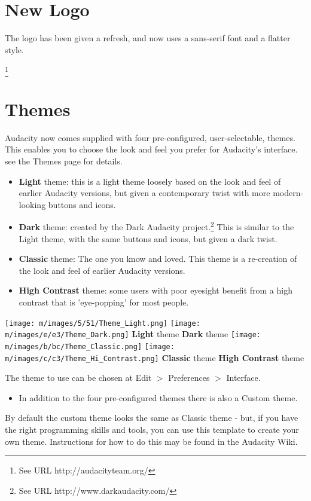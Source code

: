\section{New Logo}


The logo has been given a refresh, and now uses a sans-serif font and a flatter style.

\footnote{See URL http://audacityteam.org/}
\section{Themes}


Audacity now comes supplied with four pre-configured, user-selectable, themes.  This enables you to choose the look and feel you prefer for Audacity's interface. see the Themes page for details.
\begin{itemize}
\item \textbf{Light} theme: this is a light theme loosely based on the look and feel of earlier Audacity versions, but given a contemporary twist with more modern-looking buttons and icons. 
\item \textbf{Dark} theme: created by the Dark Audacity project.\footnote{See URL http://www.darkaudacity.com/} This is similar to the Light theme, with the same buttons and icons, but given a dark twist.
\item \textbf{Classic} theme: The one you know and loved. This theme is a re-creation of the look and feel of earlier Audacity versions. 
\item \textbf{High Contrast} theme: some users with poor eyesight benefit from a high contrast that is 'eye-popping' for most people.
\end{itemize}

\* \* \* \* \texttt{[image: m/images/5/51/Theme\_Light.png]}
\* \* \* \* \texttt{[image: m/images/e/e3/Theme\_Dark.png]}
\* \* \* \* 
\textbf{Light} theme
\* \* \* \* 
\textbf{Dark} theme
\* \* \* \* \texttt{[image: m/images/b/bc/Theme\_Classic.png]}
\* \* \* \* \texttt{[image: m/images/c/c3/Theme\_Hi\_Contrast.png]}
\* \* \* \* 
\textbf{Classic} theme
\* \* \* \* 
\textbf{High Contrast} theme

The theme to use can be chosen at Edit \mbox{$>$} Preferences \mbox{$>$} Interface.  
\begin{itemize}
\item  In addition to the four pre-configured themes there is also a Custom theme.  
\end{itemize}
 By default the custom theme looks the same as Classic theme - but, if you have the right programming skills and tools, you can use this template to create your own theme.  Instructions for how to do this may be found in the Audacity Wiki.


